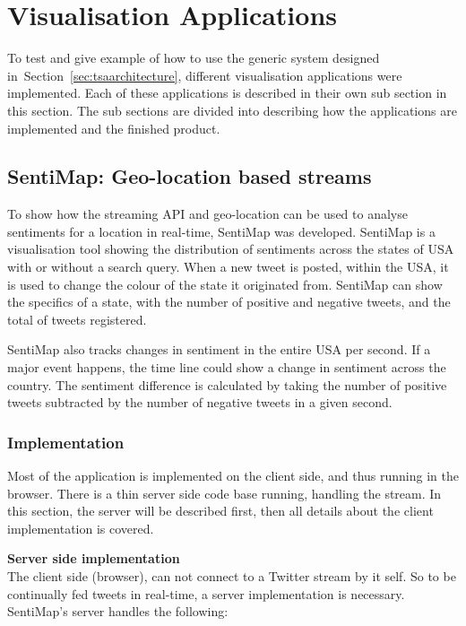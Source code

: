 \clearpage
\section{Visualisation Applications}
\label{sec:visualization_applications}
To test and give example of how to use the generic system designed in~Section~\ref{sec:tsaarchitecture}, different visualisation applications were implemented. Each of these applications is described in their own sub section in this section. The sub sections are divided into describing how the applications are implemented and the finished product.

\subsection{SentiMap: Geo-location based streams}

To show how the streaming API and geo-location can be used to analyse sentiments for a location in real-time, SentiMap was developed. SentiMap is a visualisation tool showing the distribution of sentiments across the states of USA with or without a search query. When a new tweet is posted, within the USA, it is used to change the colour of the state it originated from. SentiMap can show the specifics of a state, with the number of positive and negative tweets, and the total of tweets registered.

SentiMap also tracks changes in sentiment in the entire USA per second. If a major event happens, the time line could show a change in sentiment across the country. The sentiment difference is calculated by taking the number of positive tweets subtracted by the number of negative tweets in a given second. 

\subsubsection{Implementation}

Most of the application is implemented on the client side, and thus running in the browser. There is a thin server side code base running, handling the stream. In this section, the server will be described first, then all details about the client implementation is covered. 


\textbf{Server side implementation} \\

The client side (browser), can not connect to a Twitter stream by it self. So to be continually fed tweets in real-time, a server implementation is necessary. SentiMap's server handles the following:

